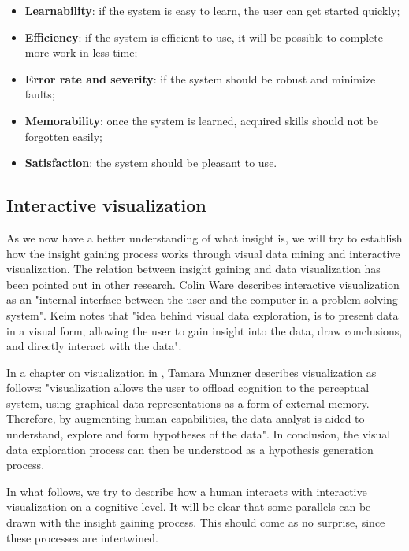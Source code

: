 \begin{itemize}
	\item \textbf{Learnability}: if the system is easy to learn, the user can get started quickly;
	\item \textbf{Efficiency}: if the system is efficient to use, it will be possible to complete more work in less time;
	\item \textbf{Error rate and severity}: if the system should be robust and minimize faults;
	\item \textbf{Memorability}: once the system is learned, acquired skills should not be forgotten easily;
	\item \textbf{Satisfaction}: the system should be pleasant to use.
\end{itemize}


\subsection{Interactive visualization}\label{chapter:literature_study:section:user:subsection:interactive}

As we now have a better understanding of what insight is, we will try to establish how the insight gaining process works through visual data mining and interactive visualization. The relation between insight gaining and data visualization has been pointed out in other research. Colin Ware \cite{ware:2004} describes interactive visualization as an "internal interface between the user and the computer in a problem solving system". Keim \cite{keim:2002} notes that "idea behind visual data exploration, is to present data in a visual form, allowing the user to gain insight into the data, draw conclusions, and directly interact with the data".

In a chapter on visualization in \cite{shirley:2009}, Tamara Munzner describes visualization as follows: "visualization allows the user to offload cognition to the perceptual system, using graphical data representations as a form of external memory. Therefore, by augmenting human capabilities, the data analyst is aided to understand, explore and form hypotheses of the data"\cite{shirley:2009}. In conclusion, the visual data exploration process can then be understood as a hypothesis generation process\cite{keim:2002}.

In what follows, we try to describe how a human interacts with interactive visualization on a cognitive level. It will be clear that some parallels can be drawn with the insight gaining process. This should come as no surprise, since these processes are intertwined\cite{keim:2002, ware:2004, yi:2008}.

